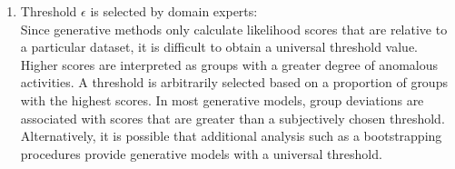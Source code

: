 \begin{enumerate}[4.]
\item Threshold $\epsilon $ is  selected by domain experts: \\  
Since generative methods only calculate likelihood scores that are relative to a particular dataset, it is difficult to obtain a universal threshold value.  Higher  scores are interpreted as groups with a greater degree of anomalous activities. A threshold is arbitrarily selected based on a proportion of  groups with the highest scores.  In most  generative models, group deviations are associated with  scores that are greater than a subjectively chosen  threshold. Alternatively, it is possible that additional analysis such as a  bootstrapping procedures  provide generative models with a universal  threshold. %
\end{enumerate} 
%
